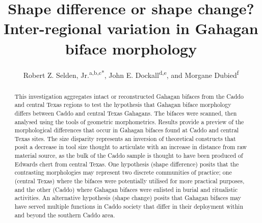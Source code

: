 \documentclass[review]{elsarticle}
\begin{document}
\begin{frontmatter}


\title{Shape difference or shape change? Inter-regional variation in Gahagan biface morphology}



\author{Robert Z. Selden, Jr.\textsuperscript{a,b,c*}, John E. Dockall\textsuperscript{d,e}, and Morgane Dubied\textsuperscript{f}}
\address[1]{Heritage Research Center, Stephen F. Austin State University, United States}
\address[2]{Cultural Heritage Department, Jean Monnet University, France}
\address[3]{ORCID ID \href{http://orcid.org/0000-0002-1789-8449}{0000-0002-1789-8449}}
\address[4]{Prewitt and Associates, Inc., United States}
\address[5]{ORCID ID \href{http://orcid.org/0000-0002-0940-7144}{0000-0002-0940-7144}}
\address[6]{Laboratoire Biogéosciences, Université de Bourgogne, France}

\begin{abstract}
This investigation aggregates intact or reconstructed Gahagan bifaces from the Caddo and central Texas regions to test the hypothesis that Gahagan biface morphology differs between Caddo and central Texas Gahagans. The bifaces were scanned, then analysed using the tools of geometric morphometrics. Results provide a preview of the morphological differences that occur in Gahagan bifaces found at Caddo and central Texas sites. The size disparity represents an inversion of theoretical constructs that posit a decrease in tool size thought to articulate with an increase in distance from raw material source, as the bulk of the Caddo sample is thought to have been produced of Edwards chert from central Texas. One hypothesis (shape difference) posits that the contrasting morphologies may represent two discrete communities of practice; one (central Texas) where the bifaces were potentially utilised for more practical purposes, and the other (Caddo) where Gahagan bifaces were enlisted in burial and ritualistic activities. An alternative hypothesis (shape change) posits that Gahagan bifaces may have served multiple functions in Caddo society that differ in their deployment within and beyond the southern Caddo area.
\end{abstract}


\end{frontmatter}
\end{document}
